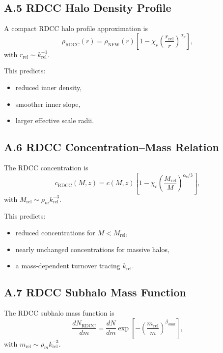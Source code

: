 \documentclass[11pt,a4paper]{article}
\begin{document}
\subsection*{A.5 RDCC Halo Density Profile}

A compact RDCC halo profile approximation is
\begin{equation}
\rho_{\mathrm{RDCC}}(r)
=
\rho_{\mathrm{NFW}}(r)
\left[
1
-
\chi_{\rho}
\left(
\frac{r_{\mathrm{rel}}}{r}
\right)^{\alpha_{\rho}}
\right],
\end{equation}
with $r_{\mathrm{rel}} \sim k_{\mathrm{rel}}^{-1}$.

This predicts:
\begin{itemize}
\item reduced inner density,
\item smoother inner slope,
\item larger effective scale radii.
\end{itemize}

\subsection*{A.6 RDCC Concentration–Mass Relation}

The RDCC concentration is
\begin{equation}
c_{\mathrm{RDCC}}(M,z)
=
c(M,z)
\left[
1
-
\chi_{c}
\left(
\frac{M_{\mathrm{rel}}}{M}
\right)^{\alpha_{c}/3}
\right],
\end{equation}
with $M_{\mathrm{rel}} \sim \rho_{m}k_{\mathrm{rel}}^{-3}$.

This predicts:
\begin{itemize}
\item reduced concentrations for $M < M_{\mathrm{rel}}$,
\item nearly unchanged concentrations for massive halos,
\item a mass-dependent turnover tracing $k_{\mathrm{rel}}$.
\end{itemize}

\subsection*{A.7 RDCC Subhalo Mass Function}

The RDCC subhalo mass function is
\begin{equation}
\frac{dN_{\mathrm{RDCC}}}{dm}
=
\frac{dN}{dm}
\exp\!\left[
-
\left(
\frac{m_{\mathrm{rel}}}{m}
\right)^{\beta_{\mathrm{shmf}}}
\right],
\end{equation}
with $m_{\mathrm{rel}} \sim \rho_{m}k_{\mathrm{rel}}^{-3}$.
\end{document}
